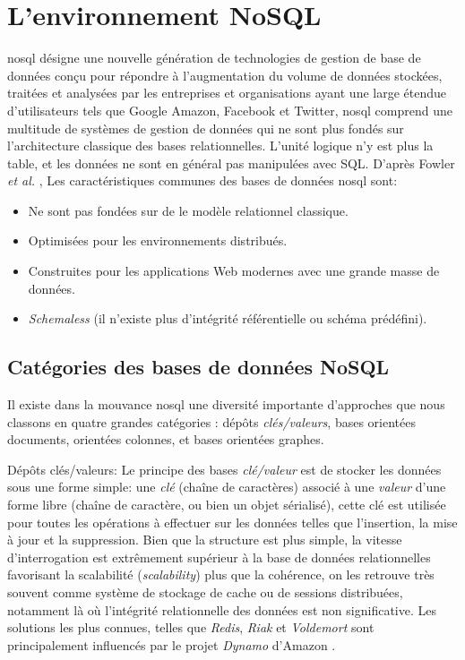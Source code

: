 \section{L'environnement NoSQL}
\label{sec:nosql}
\acrshort{nosql} désigne une nouvelle génération de technologies de
gestion de base de données conçu pour répondre à l'augmentation du
volume de données stockées, traitées et analysées par les entreprises
et organisations ayant une large étendue d'utilisateurs tels que
Google Amazon, Facebook et Twitter, \acrshort{nosql} comprend une
multitude de systèmes de gestion de données qui ne sont plus fondés
sur l'architecture classique des bases relationnelles. L'unité logique
n'y est plus la table, et les données ne sont en général pas
manipulées avec \textsc{SQL}.  D'après Fowler \textit{et al.}
\cite{sadalage2012nosql}, Les caractéristiques communes des bases de
données \acrshort{nosql} sont:

\begin{itemize}\renewcommand\labelitemi{--}
\item Ne sont pas fondées sur de le modèle relationnel classique.
\item Optimisées pour les environnements distribués.
\item Construites pour les applications Web modernes avec une grande
  masse de données.
\item \emph{Schemaless} (il n'existe plus d'intégrité référentielle ou
  schéma prédéfini).
\end{itemize}

  \subsection{Catégories des bases de données NoSQL}
  \label{sec:cat-nosql}
  Il existe dans la mouvance \acrshort{nosql} une diversité importante
  d'approches que nous classons en quatre grandes catégories
  \cite{sadalage2012nosql}: dépôts \textit {clés/valeurs}, bases
  orientées documents, orientées colonnes, et bases orientées
  graphes.\bigskip

  \textsf{Dépôts clés/valeurs}: Le principe des bases
  \textit{clé/valeur} est de stocker les données sous une forme
  simple: une \emph{clé } (chaîne de caractères) associé à une
  \emph{valeur} d'une forme libre (chaîne de caractère, ou bien un
  objet sérialisé), cette clé est utilisée pour toutes les opérations
  à effectuer sur les données telles que l'insertion, la mise à jour
  et la suppression. Bien que la structure est plus simple, la vitesse
  d'interrogation est extrêmement supérieur à la base de données
  relationnelles favorisant la scalabilité (\emph{scalability}) plus
  que la cohérence, on les retrouve très souvent comme système de
  stockage de cache ou de sessions distribuées, notamment là où
  l'intégrité relationnelle des données est non significative. Les
  solutions les plus connues, telles que \emph{Redis}, \emph{Riak} et
  \emph{Voldemort} sont principalement influencés par le projet
  \emph{Dynamo} d'Amazon \cite{decandia2007dynamo}.\bigskip

